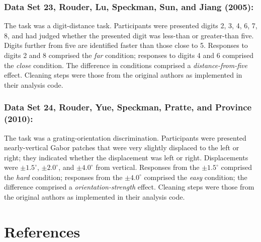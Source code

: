 \documentclass[
  english,
  ,man]{apa6}
\begin{document}
\hypertarget{data-set-23-rouderetal2005a}{%
\subsubsection{Data Set 23, Rouder, Lu, Speckman, Sun, and Jiang (2005):}\label{data-set-23-rouderetal2005a}}

The task was a digit-distance task. Participants were presented digits 2, 3, 4, 6, 7, 8, and had judged whether the presented digit was less-than or greater-than five. Digits further from five are identified faster than those close to 5. Responses to digits 2 and 8 comprised the \emph{far} condition; responses to digits 4 and 6 comprised the \emph{close} condition. The difference in conditions comprised a \emph{distance-from-five} effect. Cleaning steps were those from the original authors as implemented in their analysis code.

\hypertarget{data-set-24-rouderetal2010d}{%
\subsubsection{Data Set 24, Rouder, Yue, Speckman, Pratte, and Province (2010):}\label{data-set-24-rouderetal2010d}}

The task was a grating-orientation discrimination. Participants were presented nearly-vertical Gabor patches that were very slightly displaced to the left or right; they indicated whether the displacement was left or right. Displacements were \(\pm1.5^\circ\), \(\pm2.0^\circ\), and \(\pm4.0^\circ\) from vertical. Responses from the \(\pm1.5^\circ\) comprised the \emph{hard} condition; responses from the \(\pm4.0^\circ\) comprised the \emph{easy} condition; the difference comprised a \emph{orientation-strength} effect. Cleaning steps were those from the original authors as implemented in their analysis code.

\newpage

\hypertarget{references}{%
\section*{References}\label{references}}
\end{document}
